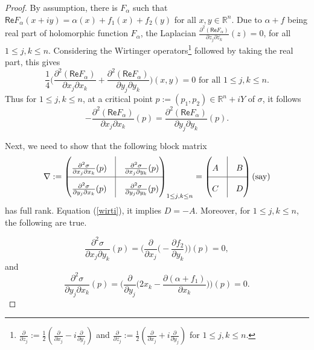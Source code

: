 \documentclass[12pt,reqno, a4paper]{amsart}
\theoremstyle{definition}
\theoremstyle{definition}
\numberwithin{equation}{section}
\def\R{\mathbb{R}}                              %
\begin{document}
\begin{proof}
By assumption, there is $F_{\alpha}$ such that  $\textsf{Re}F_{\alpha}(x+iy)=\alpha(x)+f_1(x)+f_2(y)$ for all $x,y \in \R^n$. Due to $\alpha +f$ being real part of holomorphic function $F_{\alpha}$, the Laplacian  $\frac{\partial^2(\textsf{Re}F_{\alpha})}{\partial z_j\partial \overline{z_k}}(z)=0$, for all $1\leq j,k\leq n.$ Considering  the Wirtinger operators\footnote{$\frac{\partial}{\partial z_j}:=\frac{1}{2}(\frac{\partial}{\partial x_j}-i\frac{\partial}{\partial y_j})$ and $\frac{\partial}{\partial \overline{z_j}}:=\frac{1}{2}(\frac{\partial}{\partial x_j}+i\frac{\partial}{\partial y_j})$ for $1\leq j,k\leq n.$} followed by taking the real part, this gives
$$\frac{1}{4}\Big(\frac{\partial^2(\textsf{Re}F_{\alpha})}{\partial x_j\partial {x_k}}+\frac{\partial^2(\textsf{Re}F_{\alpha})}{\partial y_j\partial {y_k}}\Big)(x,y)=0 \text{ for all } 1\leq j,k\leq n.$$
Thus for $1\leq j,k\leq n$, at a critical point $p:=(p_1,p_2)\in \R^n+iY$ of $\sigma$, it follows 
\begin{equation}\label{wirti}
	-\frac{\partial^2(\textsf{Re}F_{\alpha})}{\partial x_j\partial {x_k}}(p)=\frac{\partial^2(\textsf{Re}F_{\alpha})}{\partial y_j\partial {y_k}}(p). 
\end{equation}	


Next, we need to show that the following block matrix	
\begin{equation}\label{non_deg_matrix}	\renewcommand{\arraystretch}{2.0}
	\nabla:=\begin{pmatrix}	
	\frac{\partial^2\sigma}{\partial x_j\partial x_k}(p)
	& \vline & \frac{\partial^2\sigma}{\partial x_j\partial y_k}(p) \\ 
		\hline
	 \frac{\partial^2\sigma}{\partial y_j\partial x_k}(p)  & \vline & \frac{\partial^2\sigma}{\partial y_j\partial y_k}(p)
	\end{pmatrix}_{1\leq j,k\leq n}= \begin{pmatrix}	
	A
	& \vline & B \\ 
	\hline
	C  & \vline & D
\end{pmatrix} \text{(say)}
\renewcommand{\arraystretch}{1.0}
\end{equation}
	has full rank. Equation (\ref{wirti}), it implies $D=-A$. Moreover, for $1\leq j,k\leq n$, the following are true.

$$\frac{\partial^2\sigma}{\partial x_j\partial {y_k}}(p)
=\Big(\frac{\partial}{\partial x_j}\big(-\frac{\partial f_2}{\partial y_k}\big)\Big)(p)=0,$$
and 
$$\frac{\partial^2\sigma}{\partial y_j\partial {x_k}}(p)
=\Big(\frac{\partial}{\partial y_j}\big(2x_k-\frac{\partial (\alpha+f_1)}{\partial x_k}\big)\Big)(p)=0.$$


\end{proof}
\end{document}
